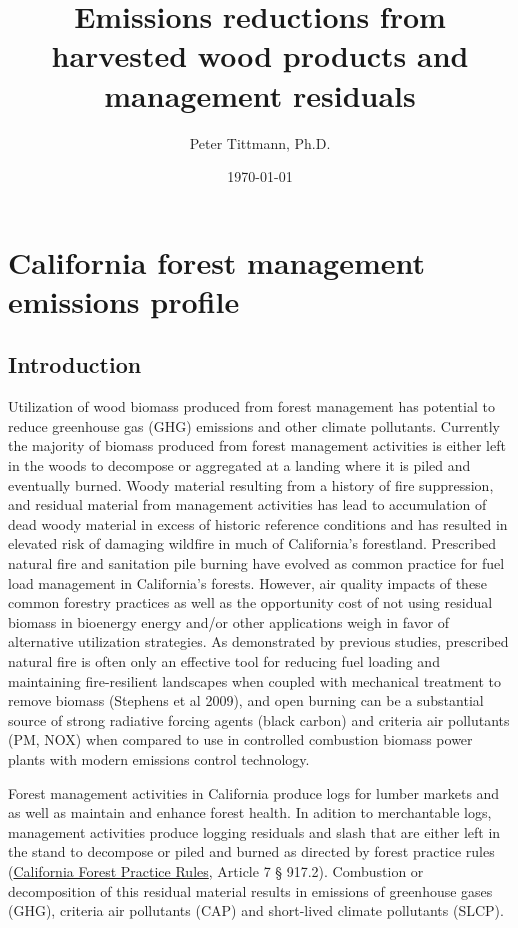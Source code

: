 \documentclass[a4paper]{article}
\author{Peter Tittmann, Ph.D.}
\date{\today}
\title{Emissions reductions from harvested wood products and management residuals}
\begin{document}
\maketitle
\tableofcontents

\pagebreak
\section{California forest management emissions profile}
\label{sec:orgheadline13}

\subsection{Introduction}
\label{sec:orgheadline2}

Utilization of wood biomass produced from forest management has
potential to reduce greenhouse gas (GHG) emissions and other climate
pollutants.  Currently the majority of biomass produced from forest
management activities is either left in the woods to decompose or
aggregated at a landing where it is piled and eventually burned. Woody
material resulting from a history of fire suppression, and residual
material from management activities has lead to accumulation of dead
woody material in excess of historic reference conditions and has
resulted in elevated risk of damaging wildfire in much of California's
forestland.  Prescribed natural fire and sanitation pile burning have
evolved as common practice for fuel load management in California’s
forests. However, air quality impacts of these common forestry practices as well as the opportunity cost of not using residual biomass in bioenergy energy and/or other applications weigh in favor of alternative utilization strategies. As demonstrated by  previous studies, prescribed natural fire is often only an effective tool for reducing fuel loading and maintaining fire-resilient landscapes when coupled with mechanical treatment to remove biomass (Stephens et al 2009), and open burning can be a substantial source of strong radiative forcing agents (black carbon) and criteria air pollutants (PM, NOX) when compared to use in controlled combustion biomass power plants with modern emissions control technology.

Forest management activities in California produce logs for
lumber markets and as well as maintain and enhance forest health.
In adition to merchantable logs, management activities produce logging residuals and slash that are either left
in the stand to decompose or piled and burned as directed by forest
practice rules (\href{http://calfire.ca.gov/resource_mgt/downloads/2013_FP_Rulebook_with_Tech_RuleNo1.pdf}{California Forest Practice Rules}, Article 7 §
917.2). Combustion or decomposition of this residual material results
in emissions of greenhouse gases (GHG), criteria air pollutants (CAP) and
short-lived climate pollutants (SLCP).
\end{document}
